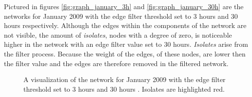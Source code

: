 Pictured in figures \ref{fig:graph_january_3h} and  \ref{fig:graph_january_30h} are the networks for January 2009 with the edge filter threshold set to 3 hours and 30 hours respectively. Although the edges within the components of the network are not visible, the amount of \textit{isolates}, nodes with a degree of zero, is noticeable higher in the network with an edge filter value set to 30 hours. \textit{Isolates} arise from the filter process. Because the weight of the edges, of these nodes, are lower then the filter value and the edges are therefore removed in the filtered network.   

\begin{figure}[htpb]%
	\centering 
	\qquad 
	\caption[Network visualizations with different edge filter values]{A visualization of the network for January 2009 with the edge filter threshold set to 3 hours  and 30 hours . Isolates are highlighted red.} 
	 
\end{figure}    

